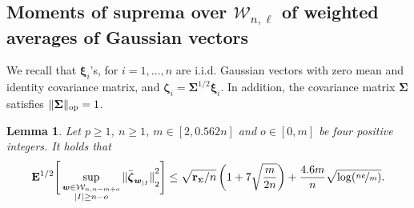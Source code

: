 \documentclass[aos,preprint,reqno]{imsart}
\newcommand\bxi{\boldsymbol\xi}
\newcommand\bzeta{\boldsymbol\zeta}
\newcommand\bSigma{\boldsymbol\Sigma}
\newcommand\bfE{\mathbf E}
\newcommand\bw{\boldsymbol w}
\newcommand\rSigma{\textbf{\textup{r}}_{\scriptscriptstyle\bSigma}}
\theoremstyle{plain}
\newtheorem{lemma}{Lemma}
\theoremstyle{remark}
\begin{document}
	\subsection{Moments of suprema over $\mathcal W_{n,\ell}$ of 
	weighted averages of Gaussian vectors}

	We recall that $\bxi_i$'s, for
	$i=1,\ldots,n$ are i.i.d. Gaussian vectors with zero mean and identity covariance
	matrix, and $\bzeta_i = \bSigma^{1/2}\bxi_i$. In addition, the covariance 
	matrix $\bSigma$ satisfies $\|\bSigma\|_{\textup{op}}=1$. 

	\begin{lemma}\label{lemma2}
	Let $p\ge 1$, $n\ge 1$, $m\in[2,0.562n]$ and $o\in [0, m]$ be four positive integers. 
	It holds that
	\begin{align}
			\bfE^{1/2}\Bigg[\sup_{\substack{\bw\in \mathcal W_{n,n-m+o} \\ |I| \ge n-o}}
			{\|\bar{\bzeta}_{\bw_{|I}}\|}_2^2\Bigg]  \le {\sqrt{\rSigma/n}}\,
			\bigg(1+7\sqrt{\frac{m}{2n}}\bigg) + \frac{4.6m}{n}\sqrt{\log(\nicefrac{ne}{m})}.
	\end{align}
	\end{lemma}
\end{document}
